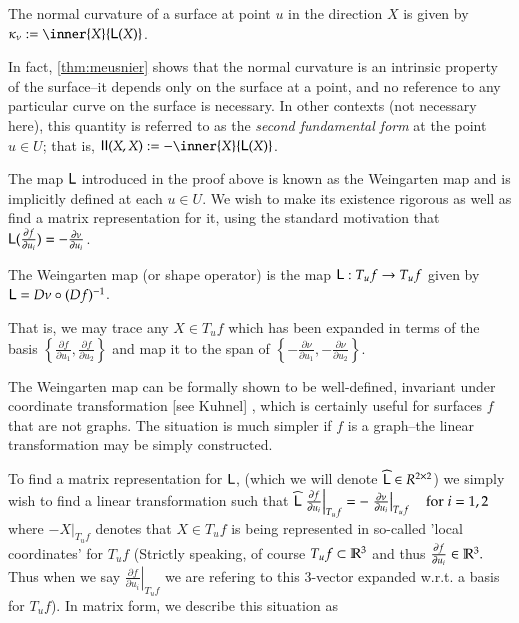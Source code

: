 		\begin{defn}
			The normal curvature of a surface at point $u$ in the direction $X$ is given by $\kappa_\nu :=  \inner{X}{\wein(X)}$.
		\end{defn}
		In fact, \cref{thm:meusnier} shows that the normal curvature is an intrinsic property of the surface--it depends only on the
		surface at a point, and no reference to any particular curve on the surface is necessary.
		In other contexts (not necessary here), this quantity is referred to as the \textit{second fundamental form} at the point $u \in U$; that is, $ \mathbf{II}(X,X) := - \inner{X}{\wein(X)}$.
		
		
		The map $\mathsf{L}$ introduced in the proof above is known as the Weingarten map
		and is implicitly defined at each $u \in U$. 
		We wish to make its existence rigorous as well as find a matrix representation for it, using the standard motivation that $\mathsf{L}(\frac{\partial f}{\partial u_i}) = - \frac{\partial \nu}{\partial u_i}$.
		
	
		\begin{defn}
		The Weingarten map (or shape operator) is the map $\mathsf{L}: T_u f \to T_u f$ given by
		$\mathsf{L} = D\nu \circ (Df)^{-1}$.
		\end{defn}
		
		
		That is, we may trace any $X \in T_u f$ which has been expanded in terms of the basis 
		$\left\{\frac{\partial f}{\partial u_1} , \frac{\partial f}{\partial u_2}\right\}$
		and map it to the span of $\left\{-\frac{\partial \nu}{\partial u_1} , -\frac{\partial \nu}{\partial u_2}\right\}$. 
		
		The Weingarten map can be formally shown to be well-defined, invariant under coordinate transformation [see Kuhnel] , which is certainly useful for surfaces $f$ that are not graphs. The situation is much simpler if $f$ is a graph--the linear transformation may be simply constructed.		
		
		To find a matrix representation for $\mathsf{L}$, (which we will denote $\widehat{\mathsf{L}} \in R^{2\times2}$) we simply wish to find a linear transformation
		such that
		$\widehat{\mathsf{L}} \left.\frac{\partial f}{\partial u_i}\right|_{T_u f}
			= - \left.\frac{\partial \nu}{\partial u_i}\right|_{T_u f} \quad \textrm{for} \; i=1,2$
				where $- \left.X\right|_{T_u f}$ denotes that $X \in T_u f$ is being represented in so-called
		'local coordinates' for $T_u f$ (Strictly speaking, of course $T_u f \subset \mathbb{R}^3$ and thus
		$\frac{\partial f}{\partial u_i} \in \mathbb{R}^3.$ Thus when we say $ \left.\frac{\partial f}{\partial u_i}\right|_{T_u f}$ we are refering to this 3-vector expanded w.r.t. a basis for $T_u f$). In matrix form, we describe this situation as
		
